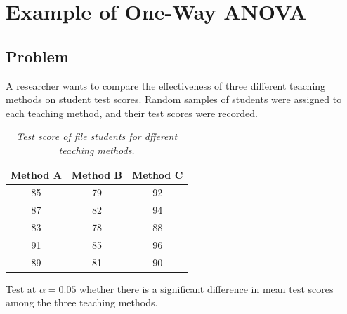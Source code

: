 \documentclass[twoside]{book}
\begin{document}
\section{Example of One-Way ANOVA}

\subsection{Problem}

A researcher wants to compare the effectiveness of three different teaching methods on student test scores. Random samples of students were assigned to each teaching method, and their test scores were recorded.

\begin{table}[H]
\centering
\begin{tabular}{c|c|c}
\toprule
\textbf{Method A} & \textbf{Method B} & \textbf{Method C} \\
\midrule
85 & 79 & 92 \\
87 & 82 & 94 \\
83 & 78 & 88 \\
91 & 85 & 96 \\
89 & 81 & 90 \\
\bottomrule
\end{tabular}
\caption{\textit{Test score of file students for dfferent teaching methods.}}
\end{table}


Test at $\alpha = 0.05$ whether there is a significant difference in mean test scores among the three teaching methods.
\end{document}
